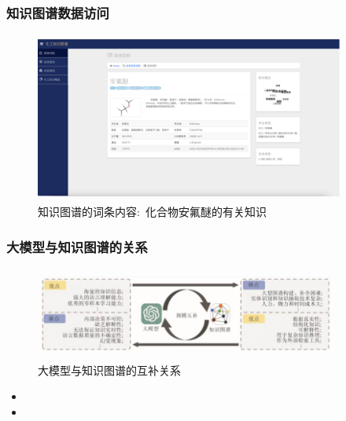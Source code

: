 \begin{frame}
	\frametitle{知识图谱数据访问}
\begin{figure}[h!]
\centering
\includegraphics[height=2.20in,width=4.00in,viewport=0 0 240 130,clip]{Figures/KG_Chem-Enflurane.png}
\caption{\tiny 知识图谱的词条内容:~化合物\textrm{安氟醚}的有关知识}%
\label{Fig:KG_Chem-Enflurane}
\end{figure}
\end{frame}

\begin{frame}
	\frametitle{大模型与知识图谱的关系}
\begin{figure}[h!]
\centering
\vskip -8pt
\includegraphics[height=1.2in,width=3.90in,viewport=3 0 185 60,clip]{Figures/KG_Chem-LLM.png}
\caption{\tiny\textrm{大模型与知识图谱的互补关系}}%
\label{Fig:KG_Chem-LLM}
\end{figure}
\begin{itemize}
	\item {\fontsize{7.2pt}{6.2pt}\selectfont{知识图谱对大模型的增强:~为大模型提供真实可靠的知识，减轻大模型产生幻觉的问题，提供解释和推理知识的手段，探究大模型内部复杂的工作步骤和推理过程}}%
	\item {\fontsize{7.2pt}{6.2pt}\selectfont{大模型对知识图谱的增强：大模型在零样本和少样本的训练中，能够应对知识图谱构建、补全、推理和问答等各种挑战}}%
\end{itemize}
\end{frame}

